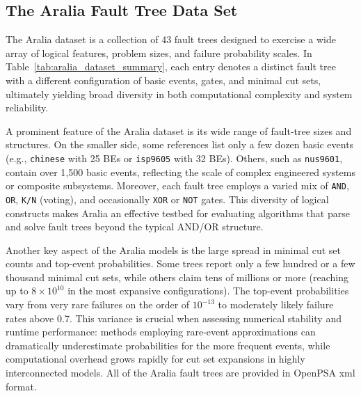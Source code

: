 \subsection{The Aralia Fault Tree Data Set}
\label{subsec:aralia_dataset}

The Aralia dataset is a collection of 43 fault trees designed to exercise a wide array of logical features, problem sizes, and failure probability scales. In Table~\ref{tab:aralia_dataset_summary}, each entry denotes a distinct fault tree with a different configuration of basic events, gates, and minimal cut sets, ultimately yielding broad diversity in both computational complexity and system reliability.

A prominent feature of the Aralia dataset is its wide range of fault-tree sizes and structures. On the smaller side, some references list only a few dozen basic events (e.g., \texttt{chinese} with 25 BEs or \texttt{isp9605} with 32 BEs). Others, such as \texttt{nus9601}, contain over 1{,}500 basic events, reflecting the scale of complex engineered systems or composite subsystems. Moreover, each fault tree employs a varied mix of \texttt{AND}, \texttt{OR}, \texttt{K/N} (voting), and occasionally \texttt{XOR} or \texttt{NOT} gates. This diversity of logical constructs makes Aralia an effective testbed for evaluating algorithms that parse and solve fault trees beyond the typical AND/OR structure.

Another key aspect of the Aralia models is the large spread in minimal cut set counts and top-event probabilities. Some trees report only a few hundred or a few thousand minimal cut sets, while others claim tens of millions or more (reaching up to \(8\times 10^{10}\) in the most expansive configurations). The top-event probabilities vary from very rare failures on the order of \(10^{-13}\) to moderately likely failure rates above 0.7. This variance is crucial when assessing numerical stability and runtime performance: methods employing rare-event approximations can dramatically underestimate probabilities for the more frequent events, while computational overhead grows rapidly for cut set expansions in highly interconnected models. All of the Aralia fault trees are provided in OpenPSA \acrfull{xml} format.

